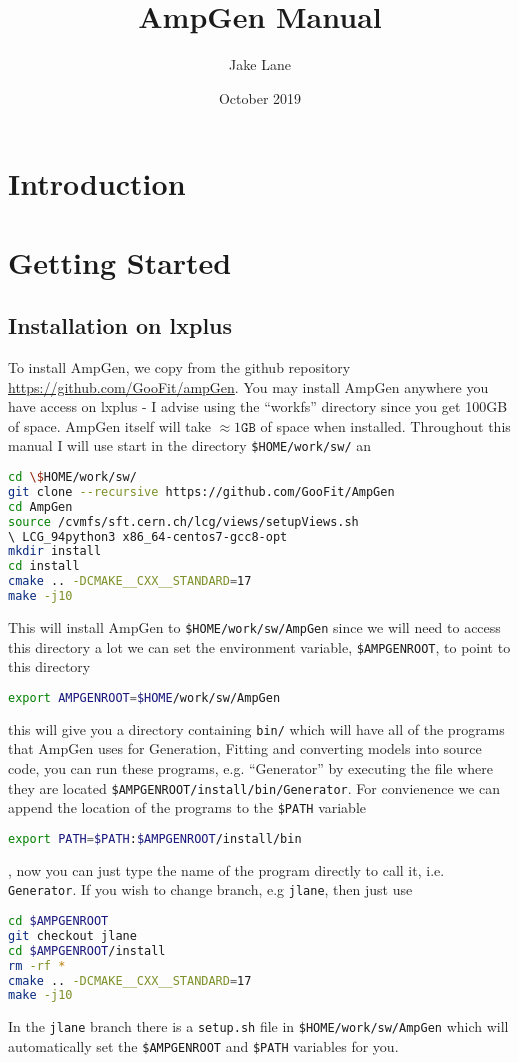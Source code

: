 \documentclass{article}
\title{AmpGen Manual}
\author{Jake Lane}
\date{October 2019}
\begin{document}
\maketitle

\section{Introduction}
\section{Getting Started}
\subsection{Installation on lxplus}
To install AmpGen, we copy from the github repository \url{https://github.com/GooFit/ampGen}. You may install AmpGen anywhere you have access on lxplus - I advise using the ``workfs'' directory since you get 100GB of space. AmpGen itself will take $\approx 1\texttt{GB}$ of space when installed. Throughout this manual I will use start in the directory \texttt{\$HOME/work/sw/} an
\begin{lstlisting}[language=bash]
cd \$HOME/work/sw/
git clone --recursive https://github.com/GooFit/AmpGen
cd AmpGen
source /cvmfs/sft.cern.ch/lcg/views/setupViews.sh 
\ LCG_94python3 x86_64-centos7-gcc8-opt
mkdir install
cd install
cmake .. -DCMAKE__CXX__STANDARD=17
make -j10
\end{lstlisting}
This will install AmpGen to \texttt{\$HOME/work/sw/AmpGen} since we will need to access this directory a lot we can set the environment variable, \texttt{\$AMPGENROOT}, to point to this directory
\begin{lstlisting}[language=bash]
export AMPGENROOT=$HOME/work/sw/AmpGen
\end{lstlisting}
this will give you a directory containing \texttt{bin/} which will have all of the programs that AmpGen uses for Generation, Fitting and converting models into source code, you can run these programs, e.g. ``Generator'' by executing the file where they are located \texttt{\$AMPGENROOT/install/bin/Generator}. For convienence we can append the location of the programs to the \texttt{\$PATH} variable
\begin{lstlisting}[language=bash]
export PATH=$PATH:$AMPGENROOT/install/bin
\end{lstlisting},
now you can just type the name of the program directly to call it, i.e. \texttt{Generator}.
If you wish to change branch, e.g \texttt{jlane}, then just use
\begin{lstlisting}[language=bash]
cd $AMPGENROOT
git checkout jlane
cd $AMPGENROOT/install
rm -rf * 
cmake .. -DCMAKE__CXX__STANDARD=17
make -j10
\end{lstlisting}
In the \texttt{jlane} branch there is a \texttt{setup.sh} file in \texttt{\$HOME/work/sw/AmpGen} which will automatically set the \texttt{\$AMPGENROOT} and \texttt{\$PATH} variables for you. 
\end{document}
